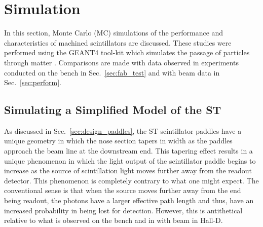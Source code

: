 \section{Simulation} \label{sec:sim}

In this section, Monte Carlo (MC) simulations of the performance and characteristics of machined scintillators are discussed.  These studies were performed using the GEANT4 tool-kit which simulates the passage of particles through matter \cite{geant4_website}.  Comparisons are made with data observed in experiments conducted on the bench in Sec.~\ref{sec:fab_test} and with beam data in Sec.~\ref{sec:perform}.  


\subsection{Simulating a Simplified Model of the ST} \label{sec:sim_simple}

As discussed in Sec.~\ref{sec:design_paddles}, the ST scintillator paddles have a unique geometry in which the nose section tapers in width as the paddles approach the beam line at the downstream end.  This tapering effect results in a unique phenomenon in which the light output of the scintillator paddle begins to increase as the source of scintillation light moves further away from the readout detector.  This phenomenon is completely contrary to what one might expect. The conventional sense is that when the source moves further away from the end being readout, the photons have a larger effective path length and thus, have an increased probability in being lost for detection.  However, this is antithetical relative to what is observed on the bench and in with beam in Hall-D.

